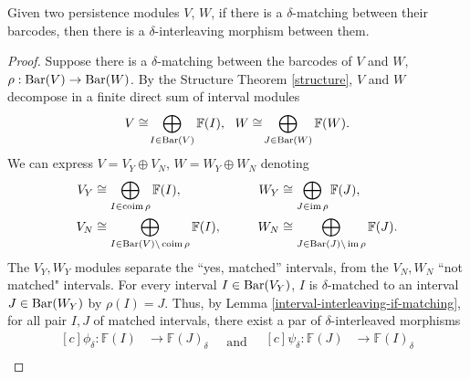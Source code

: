 \begin{proposition}\label{interleaving-if-mathing}
    Given two persistence modules $ V $, $ W $, if there is a $ \delta$-matching between their barcodes, then there is a $ \delta$-interleaving morphism between them.
\end{proposition}
\begin{proof}
    Suppose there is a $\delta$-matching between the barcodes of $ V $ and $ W $, $\rho: \operatorname{Bar} (V) \to \operatorname{Bar} (W) $. By the Structure Theorem \ref{structure}, $ V $ and $ W $ decompose in a finite direct sum of interval modules
    $$
        V \cong \! \bigoplus_{I \in \operatorname{Bar} (V)} \mathbb F (I), \ \ W \cong \! \bigoplus_{J \in  \operatorname{Bar} (W)} \mathbb F (W) .
    $$
    We can express $ V = V_Y \oplus V_N $, $ W = W_Y \oplus W_N $ denoting
    \begin{equation*}
        \begin{aligned}[c]
        V_Y &\cong \bigoplus_{I \in  \operatorname{coim} \rho} \mathbb F (I),\\
        V_N &\cong \bigoplus_{I \in \operatorname{Bar}(V) \backslash \operatorname{coim} \rho} \mathbb F (I),\\
        \end{aligned}
        \quad \quad \quad
        \begin{aligned}[c]
        W_Y &\cong \bigoplus_{J \in  \operatorname{im} \rho} \mathbb F (J),\\
        W_N &\cong \bigoplus_{J \in \operatorname{Bar}(J) \backslash \operatorname{im} \rho} \mathbb F (J).
        \end{aligned}
    \end{equation*}
    The $ V_Y, W_Y $ modules separate the ``yes, matched'' intervals, from the $ V_N, W_N $ ``not matched" intervals. For every interval $ I \in \operatorname{Bar}(V_Y) $, $ I $ is $\delta$-matched to an interval $ J \in \operatorname{Bar}(W_Y)$ by $\rho(I) = J $. Thus, by Lemma \ref{interval-interleaving-if-matching}, for all pair $ I, J $ of matched intervals, there exist a par of $\delta$-interleaved morphisms
    \begin{equation*}
        \begin{aligned}[c]
        \phi_\delta: \mathbb F(I) &\to \mathbb F(J)_\delta\\
        \end{aligned}
        \quad \text{and} \quad
        \begin{aligned}[c]
        \psi_\delta: \mathbb F(J) &\to \mathbb F(I)_\delta\\
        \end{aligned}

\end{equation*}
\end{proof}
